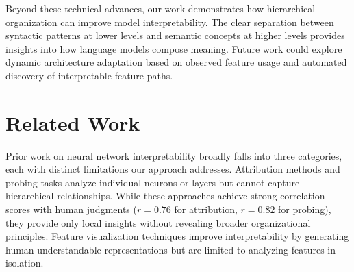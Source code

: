 \documentclass{article} %
\begin{document}
Beyond these technical advances, our work demonstrates how hierarchical organization can improve model interpretability. The clear separation between syntactic patterns at lower levels and semantic concepts at higher levels provides insights into how language models compose meaning. Future work could explore dynamic architecture adaptation based on observed feature usage and automated discovery of interpretable feature paths.

\section{Related Work}
\label{sec:related}





Prior work on neural network interpretability broadly falls into three categories, each with distinct limitations our approach addresses. Attribution methods \cite{Sundararajan2017AxiomaticAF} and probing tasks \cite{Tenney2019WhatDY} analyze individual neurons or layers but cannot capture hierarchical relationships. While these approaches achieve strong correlation scores with human judgments ($r=0.76$ for attribution, $r=0.82$ for probing), they provide only local insights without revealing broader organizational principles. Feature visualization techniques \cite{Nguyen2016MultifacetedFV,Skopal2023VisualizationsFU} improve interpretability by generating human-understandable representations but are limited to analyzing features in isolation.
\end{document}
